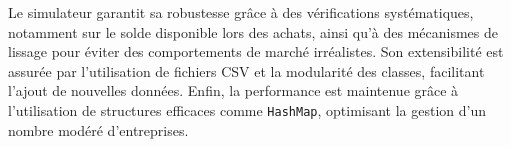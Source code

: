 \vspace{0.5cm}

Le simulateur garantit sa robustesse grâce à des vérifications systématiques, notamment sur le solde disponible lors des achats, ainsi qu'à des mécanismes de lissage pour éviter des comportements de marché irréalistes.
Son extensibilité est assurée par l'utilisation de fichiers CSV et la modularité des classes, facilitant l'ajout de nouvelles données.
Enfin, la performance est maintenue grâce à l'utilisation de structures efficaces comme \texttt{HashMap}, optimisant la gestion d'un nombre modéré d’entreprises.









